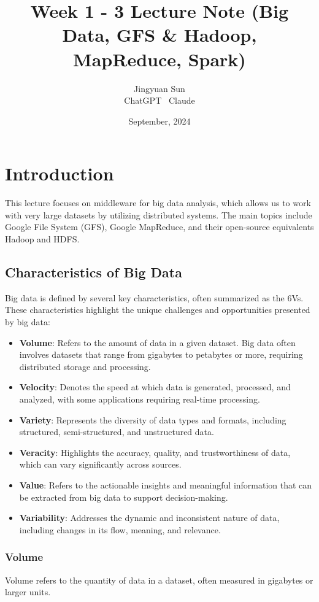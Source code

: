 \documentclass[12pt]{article}
\title{Week 1 - 3 Lecture Note (Big Data, GFS \& Hadoop, MapReduce, Spark)}
\author{Jingyuan Sun \\ ChatGPT \ Claude}
\date{September, 2024}
\begin{document}
\maketitle

\tableofcontents

\section{Introduction}
This lecture focuses on middleware for big data analysis, which allows us to work with very large datasets by utilizing distributed systems. The main topics include Google File System (GFS), Google MapReduce, and their open-source equivalents Hadoop and HDFS.

\subsection{Characteristics of Big Data}
Big data is defined by several key characteristics, often summarized as the 6Vs. These characteristics highlight the unique challenges and opportunities presented by big data:

\begin{itemize}
    \item \textbf{Volume}: Refers to the amount of data in a given dataset. Big data often involves datasets that range from gigabytes to petabytes or more, requiring distributed storage and processing.
    \item \textbf{Velocity}: Denotes the speed at which data is generated, processed, and analyzed, with some applications requiring real-time processing.
    \item \textbf{Variety}: Represents the diversity of data types and formats, including structured, semi-structured, and unstructured data.
    \item \textbf{Veracity}: Highlights the accuracy, quality, and trustworthiness of data, which can vary significantly across sources.
    \item \textbf{Value}: Refers to the actionable insights and meaningful information that can be extracted from big data to support decision-making.
    \item \textbf{Variability}: Addresses the dynamic and inconsistent nature of data, including changes in its flow, meaning, and relevance.
\end{itemize}

\subsubsection{Volume}
Volume refers to the quantity of data in a dataset, often measured in gigabytes or larger units. 
\end{document}
